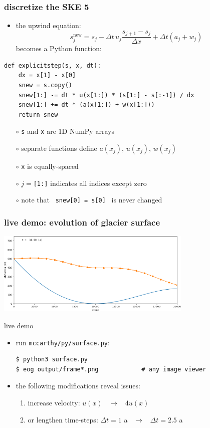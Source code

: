 \documentclass[10pt,dvipsnames]{beamer}
\newcommand{\snew}{s^{\text{new}}}
\begin{document}
\begin{frame}[fragile]\frametitle{discretize the SKE 5}

\begin{itemize}
\item the upwind equation:
    $$\snew_j = s_j - \Delta t\, u_j \frac{s_{j+1}-s_j}{\Delta x} + \Delta t (a_j + w_j)$$
becomes a Python function:
\end{itemize}
\begin{lstlisting}[language=PythonPlus]
def explicitstep(s, x, dt):
    dx = x[1] - x[0]
    snew = s.copy()
    snew[1:] -= dt * u(x[1:]) * (s[1:] - s[:-1]) / dx
    snew[1:] += dt * (a(x[1:]) + w(x[1:]))
    return snew
\end{lstlisting}

\vspace{-2mm}
{\footnotesize
    \begin{itemize}
    \item[$\circ$] \texttt{s} and \texttt{x} are 1D NumPy arrays
    \item[$\circ$] separate functions define $a(x_j)$, $u(x_j)$, $w(x_j)$
    \item[$\circ$] \texttt{x} is equally-spaced
    \item[$\circ$] $j=$\texttt{[1:]} indicates all indices except zero
    \item[$\circ$] note that \, \texttt{snew[0] = s[0]} \, is never changed
    \end{itemize}
}
\end{frame}


\begin{frame}[fragile]
\frametitle{live demo: evolution of glacier surface}
\begin{center}
\includegraphics[width=0.7\textwidth]{frame010}
\end{center}

\bigskip
\begin{block}{live demo}
\begin{itemize}
\item run \texttt{mccarthy/py/surface.py}:
\begin{verbatim}
$ python3 surface.py
$ eog output/frame*.png            # any image viewer
\end{verbatim}
\item the following modifications reveal issues:
    \begin{enumerate}
    \item increase velocity: \quad $u(x)$ \, $\to$ \, $4 u(x)$
    \item or lengthen time-steps: \quad $\Delta t = 1$ a \, $\to$ \, $\Delta t = 2.5$ a
    \end{enumerate}
\end{itemize}
\end{block}
\end{frame}
\end{document}
